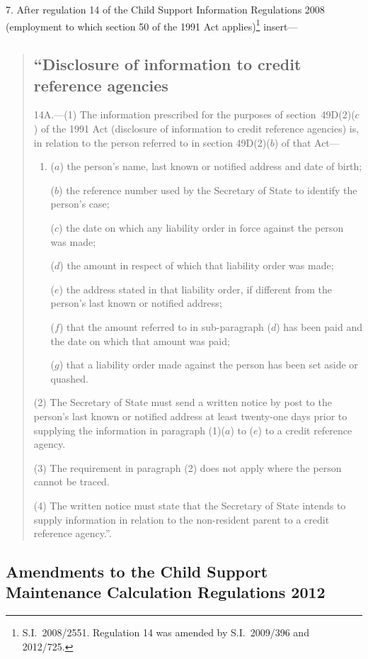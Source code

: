 \documentclass[12pt,a4paper]{article}
\begin{document}
7.  After regulation 14 of the Child Support Information Regulations 2008 (employment to which section 50 of the 1991 Act applies)\footnote{S.I.~2008/2551. Regulation 14 was amended by S.I.~2009/396 and 2012/725.} insert—
\begin{quotation}
\subsection*{“Disclosure of information to credit reference agencies}

14A.—(1) The information prescribed for the purposes of section~49D(2)($c$)  of the 1991 Act (disclosure of information to credit reference agencies) is, in relation to the person referred to in section 49D(2)($b$)  of that Act—
\begin{enumerate}\item[]
($a$) the person’s name, last known or notified address and date of birth;

($b$) the reference number used by the Secretary of State to identify the person’s case;

($c$) the date on which any liability order in force against the person was made;

($d$) the amount in respect of which that liability order was made;

($e$) the address stated in that liability order, if different from the person’s last known or notified address;

($f$) that the amount referred to in sub-paragraph ($d$)  has been paid and the date on which that amount was paid;

($g$) that a liability order made against the person has been set aside or quashed.
\end{enumerate}

(2) The Secretary of State must send a written notice by post to the person’s last known or notified address at least twenty-one days prior to supplying the information in paragraph (1)($a$)  to ($e$)  to a credit reference agency.

(3) The requirement in paragraph (2) does not apply where the person cannot be traced.

(4) The written notice must state that the Secretary of State intends to supply information in relation to the non-resident parent to a credit reference agency.”.
\end{quotation}

\subsection[8. Amendments to the Child Support Maintenance Calculation Regulations 2012]{Amendments to the Child Support Maintenance Calculation Regulations 2012}
\end{document}
